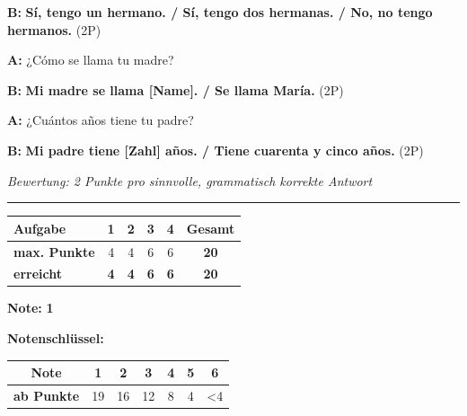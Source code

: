 \documentclass[11pt, a4paper]{article}
\newcommand{\lsg}[1]{\textcolor{loesung}{\textbf{#1}}}
\begin{document}
\vspace{0.8em}

\noindent
\textbf{B:} \lsg{Sí, tengo un hermano. / Sí, tengo dos hermanas. / No, no tengo hermanos.} \hfill (2P)

\vspace{0.8em}

\noindent
\textbf{A:} ¿Cómo se llama tu madre?

\vspace{0.8em}

\noindent
\textbf{B:} \lsg{Mi madre se llama [Name]. / Se llama María.} \hfill (2P)

\vspace{0.8em}

\noindent
\textbf{A:} ¿Cuántos años tiene tu padre?

\vspace{0.8em}

\noindent
\textbf{B:} \lsg{Mi padre tiene [Zahl] años. / Tiene cuarenta y cinco años.} \hfill (2P)

\textit{\textcolor{grau}{Bewertung: 2 Punkte pro sinnvolle, grammatisch korrekte Antwort}}

\vspace{25pt}
\hrule
\vspace{10pt}

\noindent
\begin{tabularx}{\textwidth}{|X|c|c|c|c||c|}
\hline
\textbf{Aufgabe} & 1 & 2 & 3 & 4 & \textbf{Gesamt} \\
\hline
\textbf{max. Punkte} & 4 & 4 & 6 & 6 & \textbf{20} \\
\hline
\textbf{erreicht} & \lsg{4} & \lsg{4} & \lsg{6} & \lsg{6} & \lsg{20} \\
\hline
\end{tabularx}

\vspace{10pt}

\begin{flushright}
\textbf{Note:} \lsg{1}
\end{flushright}

\vspace{1em}

\textbf{Notenschlüssel:}

\begin{tabular}{|c|c|c|c|c|c|c|}
\hline
\textbf{Note} & 1 & 2 & 3 & 4 & 5 & 6 \\
\hline
\textbf{ab Punkte} & 19 & 16 & 12 & 8 & 4 & <4 \\
\hline
\end{tabular}
\end{document}
